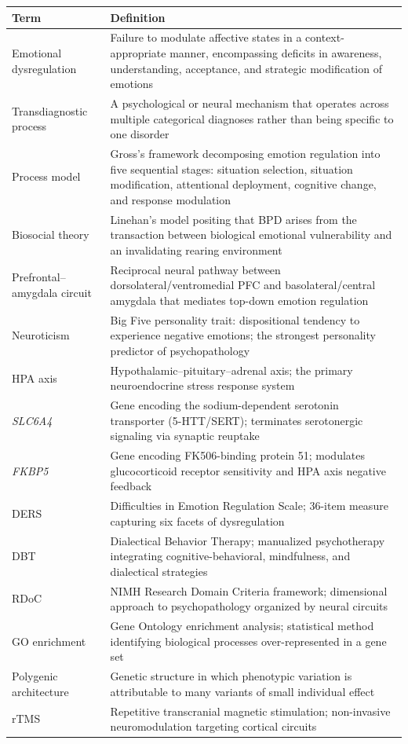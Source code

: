 \documentclass[10pt]{article}
\newcommand{\gene}[1]{\textit{#1}}
\begin{document}
{\TSBody\small
\begin{longtable}{@{}p{3.8cm}p{10.5cm}@{}}
\toprule
\textbf{Term} & \textbf{Definition} \\
\midrule
\endhead
Emotional dysregulation & Failure to modulate affective states in a context-appropriate manner, encompassing deficits in awareness, understanding, acceptance, and strategic modification of emotions \\[3pt]
Transdiagnostic process & A psychological or neural mechanism that operates across multiple categorical diagnoses rather than being specific to one disorder \\[3pt]
Process model & Gross's framework decomposing emotion regulation into five sequential stages: situation selection, situation modification, attentional deployment, cognitive change, and response modulation \\[3pt]
Biosocial theory & Linehan's model positing that BPD arises from the transaction between biological emotional vulnerability and an invalidating rearing environment \\[3pt]
Prefrontal--amygdala circuit & Reciprocal neural pathway between dorsolateral/ventromedial PFC and basolateral/central amygdala that mediates top-down emotion regulation \\[3pt]
Neuroticism & Big Five personality trait: dispositional tendency to experience negative emotions; the strongest personality predictor of psychopathology \\[3pt]
HPA axis & Hypothalamic--pituitary--adrenal axis; the primary neuroendocrine stress response system \\[3pt]
\gene{SLC6A4} & Gene encoding the sodium-dependent serotonin transporter (5-HTT/SERT); terminates serotonergic signaling via synaptic reuptake \\[3pt]
\gene{FKBP5} & Gene encoding FK506-binding protein 51; modulates glucocorticoid receptor sensitivity and HPA axis negative feedback \\[3pt]
DERS & Difficulties in Emotion Regulation Scale; 36-item measure capturing six facets of dysregulation \\[3pt]
DBT & Dialectical Behavior Therapy; manualized psychotherapy integrating cognitive-behavioral, mindfulness, and dialectical strategies \\[3pt]
RDoC & NIMH Research Domain Criteria framework; dimensional approach to psychopathology organized by neural circuits \\[3pt]
GO enrichment & Gene Ontology enrichment analysis; statistical method identifying biological processes over-represented in a gene set \\[3pt]
Polygenic architecture & Genetic structure in which phenotypic variation is attributable to many variants of small individual effect \\[3pt]
rTMS & Repetitive transcranial magnetic stimulation; non-invasive neuromodulation targeting cortical circuits \\
\bottomrule
\end{longtable}}
\end{document}
